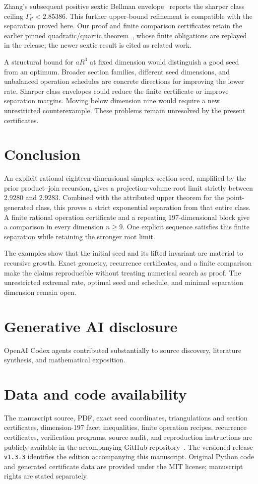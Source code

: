 \documentclass[11pt]{article}
\newcommand{\CC}{\mathcal C}
\begin{document}
Zhang's subsequent positive sextic Bellman envelope~\cite{mxym-sextic}
reports the sharper class ceiling $\Gamma_{\CC}<2.85386$. This further
upper-bound refinement is compatible with the separation proved here.
Our proof and finite comparison certificates retain the earlier pinned
quadratic/quartic theorem~\cite{mxym-upper}, whose finite obligations are
replayed in the release; the newer sextic result is cited as related work.

A structural bound for $aR^3$ at fixed dimension would distinguish a
good seed from an optimum. Broader section families, different seed
dimensions, and unbalanced operation schedules are concrete directions
for improving the lower rate. Sharper class envelopes could reduce the
finite certificate or improve separation margins. Moving below dimension
nine would require a new unrestricted counterexample. These problems
remain unresolved by the present certificates.

\section{Conclusion}
An explicit rational eighteen-dimensional simplex-section seed, amplified by the prior
product--join recursion, gives a projection-volume root limit strictly
between $2.9280$ and $2.9283$. Combined with the attributed upper theorem
for the point-generated class, this proves a strict exponential
separation from that entire class. A finite rational operation
certificate and a repeating 197-dimensional block give a comparison in
every dimension $n\ge9$. One explicit sequence satisfies this finite
separation while retaining the stronger root limit.

The examples show that the initial seed and its lifted invariant are
material to recursive growth. Exact geometry, recurrence certificates,
and a finite comparison make the claims reproducible without treating
numerical search as proof. The unrestricted extremal rate, optimal seed
and schedule, and minimal separation dimension remain open.

\section*{Generative AI disclosure}
OpenAI Codex agents contributed substantially to source discovery,
literature synthesis, and mathematical exposition.

\section*{Data and code availability}
The manuscript source, PDF, exact seed coordinates, triangulations and section certificates,
dimension-197 facet inequalities, finite operation recipes, recurrence certificates,
verification programs, source audit, and reproduction instructions are
publicly available in the accompanying GitHub repository~\cite{data}.
The versioned release \texttt{v1.3.3} identifies the edition accompanying
this manuscript. Original Python code and generated certificate data are
provided under the MIT license; manuscript rights are stated separately.
\end{document}
